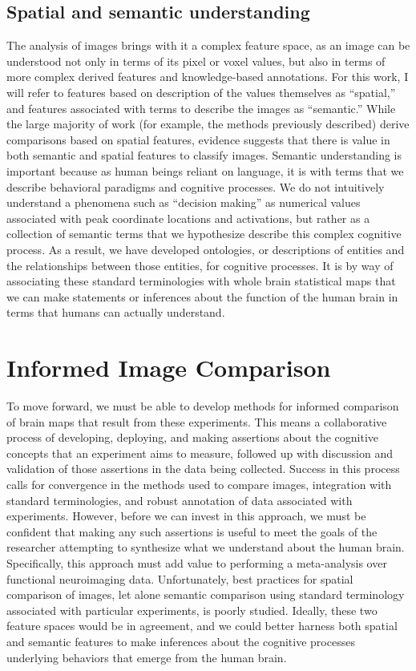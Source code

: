 \documentclass{report}
\begin{document}
\subsection{Spatial and semantic understanding}

The analysis of images brings with it a complex feature space, as an
image can be understood not only in terms of its pixel or voxel values,
but also in terms of more complex derived features and knowledge-based
annotations. For this work, I will refer to features based on
description of the values themselves as ``spatial,'' and features
associated with terms to describe the images as ``semantic.'' While the
large majority of work (for example, the methods previously described)
derive comparisons based on spatial features, evidence suggests that
there is value in both semantic and spatial features \cite{Sochat2014-wz}
to classify images. Semantic understanding is important because as human
beings reliant on language, it is with terms that we describe behavioral
paradigms and cognitive processes. We do not intuitively understand a
phenomena such as ``decision making'' as numerical values associated
with peak coordinate locations and activations, but rather as a
collection of semantic terms that we hypothesize describe this complex
cognitive process. As a result, we have developed ontologies, or
descriptions of entities and the relationships between those entities,
for cognitive processes. It is by way of associating these standard
terminologies with whole brain statistical maps that we can make
statements or inferences about the function of the human brain in terms
that humans can actually understand.

\section{Informed Image Comparison}

To move forward, we must be able to develop methods for informed comparison of brain
maps that result from these experiments. This means a collaborative
process of developing, deploying, and making assertions about the
cognitive concepts that an experiment aims to measure, followed up with
discussion and validation of those assertions in the data being
collected. Success in this process calls for convergence in the
methods used to compare images, integration with standard
terminologies, and robust annotation of data associated with
experiments. However, before we can invest in this approach, we must be
confident that making any such assertions is useful to meet the goals of
the researcher attempting to synthesize what we understand about the
human brain. Specifically, this approach must add value to performing a
meta-analysis over functional neuroimaging data. Unfortunately, best
practices for spatial comparison of images, let alone semantic
comparison using standard terminology associated with particular
experiments, is poorly studied. Ideally, these two feature spaces would
be in agreement, and we could better harness both spatial and semantic
features to make inferences about the cognitive processes underlying
behaviors that emerge from the human brain.
\end{document}
